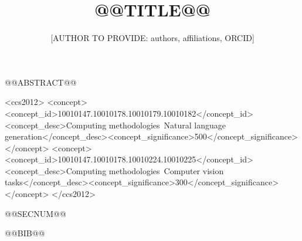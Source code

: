 \documentclass[manuscript,screen]{acmart}
\begin{document}
\title{@@TITLE@@}
\author{[AUTHOR TO PROVIDE: authors, affiliations, ORCID]}
@@ABSTRACT@@
\begin{CCSXML}
<ccs2012>
<concept><concept_id>10010147.10010178.10010179.10010182</concept_id><concept_desc>Computing methodologies~Natural language generation</concept_desc><concept_significance>500</concept_significance></concept>
<concept><concept_id>10010147.10010178.10010224.10010225</concept_id><concept_desc>Computing methodologies~Computer vision tasks</concept_desc><concept_significance>300</concept_significance></concept>
</ccs2012>
\end{CCSXML}
\maketitle
@@SECNUM@@

@@BIB@@
\end{document}
